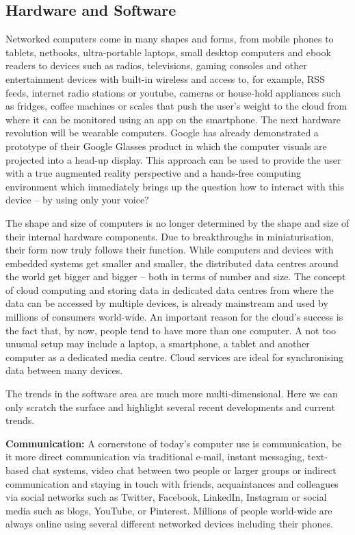 \documentclass[10pt, plain]{../../metanetpaper}
\begin{document}
\begin{multicols}{2}
\subsection{Hardware and Software}
\label{sec:hardware-software}

Networked computers come in many shapes and forms, from mobile phones to tablets, netbooks, ultra-portable laptops, small desktop computers and ebook readers to devices such as radios, televisions, gaming consoles and other entertainment devices with built-in wireless and access to, for example, RSS feeds, internet radio stations or youtube, cameras or house-hold appliances such as fridges, coffee machines or scales that push the user's weight to the cloud from where it can be monitored using an app on the smartphone. The next hardware revolution will be wearable computers. Google has already demonstrated a prototype of their Google Glasses product in which the computer visuals are projected into a head-up display. This approach can be used to provide the user with a true augmented reality perspective and a hands-free computing environment which immediately brings up the question how to interact with this device -- by using only your voice?

The shape and size of computers is no longer determined by the shape and size of their internal hardware components. Due to breakthroughs in miniaturisation, their form now truly follows their function. While computers and devices with embedded systems get smaller and smaller, the distributed data centres around the world get bigger and bigger -- both in terms of number and size. The concept of cloud computing and storing data in dedicated data centres from where the data can be accessed by multiple devices, is already mainstream and used by millions of consumers world-wide. An important reason for the cloud's success is the fact that, by now, people tend to have more than one computer. A not too unusual setup may include a laptop, a smartphone, a tablet and another computer as a dedicated media centre. Cloud services are ideal for synchronising data between many devices.

The trends in the software area are much more multi-dimensional. Here we can only scratch the surface and highlight several recent developments and current trends.

\textbf{Communication:} A cornerstone of today's computer use is communication, be it more direct communication via traditional e-mail, instant messaging, text-based chat systems, video chat between two people or larger groups or indirect communication and staying in touch with friends, acquaintances and colleagues via social networks such as Twitter, Facebook, LinkedIn, Instagram or social media such as blogs, YouTube, or Pinterest. Millions of people world-wide are always online using several different networked devices including their phones. 


\end{multicols}
\end{document}
